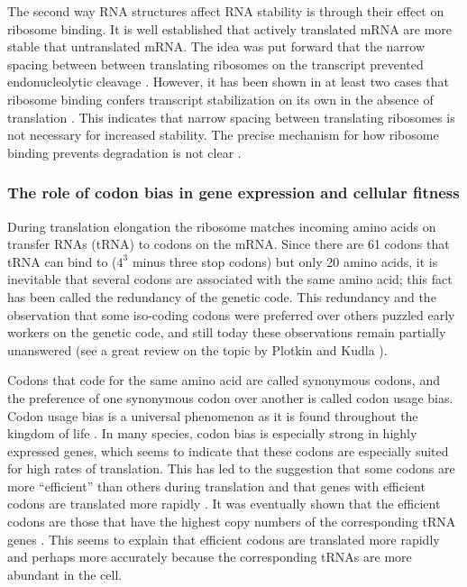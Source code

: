 The second way RNA structures affect RNA stability is through their effect on
ribosome binding. It is well established that actively translated mRNA are more
stable that untranslated mRNA. The idea was put forward that the narrow spacing
between between translating ribosomes on the transcript prevented
endonucleolytic cleavage \cite{deana_lost_2005}. However, it has been shown in
at least two cases that ribosome binding confers transcript stabilization on
its own in the absence of translation \cite{wagner_efficient_1994,
hambraeus_5_2002}.  This indicates that narrow spacing between translating
ribosomes is not necessary for increased stability. The precise mechanism for
how ribosome binding prevents degradation is not clear \cite{deana_lost_2005}.

\subsubsection{The role of codon bias in gene expression and cellular fitness}
During translation elongation the ribosome matches incoming amino acids on
transfer RNAs (tRNA) to codons on the mRNA. Since there are 61 codons that tRNA
can bind to ($4^3$ minus three stop codons) but only 20 amino acids, it is
inevitable that several codons are associated with the same amino acid; this
fact has been called the redundancy of the genetic code. This redundancy and
the observation that some iso-coding codons were preferred over others puzzled
early workers on the genetic code, and still today these observations remain
partially unanswered (see a great review on the topic by Plotkin and Kudla
\cite{plotkin_synonymous_2011}).

Codons that code for the same amino acid are called synonymous codons, and the
preference of one synonymous codon over another is called codon usage bias.
Codon usage bias is a universal phenomenon as it is found throughout the
kingdom of life \cite{sharp_codon_1988}. In many species, codon bias is
especially strong in highly expressed genes, which seems to indicate that these
codons are especially suited for high rates of translation. This has led to
the suggestion that some codons are more ``efficient'' than others during
translation and that genes with efficient codons are translated more
rapidly \cite{moriyama_gene_1998}. It was eventually shown that the efficient
codons are those that have the highest copy numbers of the corresponding tRNA
genes \cite{reis_solving_2004, elf_selective_2003}. This seems to explain that
efficient codons are translated more rapidly and perhaps more accurately
because the corresponding tRNAs are more abundant in the cell.

